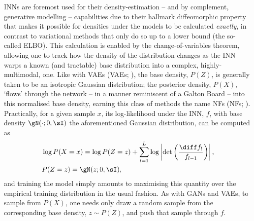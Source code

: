 \Acp{INN} are foremost used for their density-estimation -- and by complement, generative modelling
-- capabilities due to their hallmark diffeomorphic property that makes it possible for densities
under the models to be calculated \emph{exactly}, in contrast to variational methods that only do
so up to a lower bound (the so-called \ac{ELBO}). 
%
%
This calculation is enabled by the change-of-variables theorem, allowing one to track how the
density of the distribution changes as the \ac{INN} warps a known (and tractable) base distribution
into a complex, highly-multimodal, one.
%
Like with \aclp{VAE} (\acsp{VAE}; \citealp{kingma2014auto}), the base density, \(P(Z)\), is generally
taken to be an isotropic Gaussian distribution; the posterior density, \(P(X)\), `flows' through
the network -- in a manner reminiscent of a Galton Board -- into this normalised base density,
earning this class of methods the name \aclp{NF} (\acsp{NF}; \citealp{rezende2015variational,
kobyzev2020normalizing}).
%
Practically, for a given sample \(x\), its log-likelihood under the \ac{INN}, \(f\), with base
density \(\gN(\cdot; 0, \sI)\) the aforementioned Gaussian distribution, can be computed as
%
\begin{equation*}
%
    \begin{aligned}
        &\log P(X=x) = 
        \log P(Z=z) + \sum_{l=1}^L \log \left| \det\left( \frac{\diff f_l}{ f_{l-1}}\right)
        \right|, \\
        &P(Z=z) = \gN(z; 0, \sI),
    \end{aligned}
\label{eq:cov}
%
\end{equation*}
%
and training the model simply amounts to maximising this quantity over the empirical training
distribution in the usual fashion.
%
As with \acp{GAN} and \acp{VAE}, to sample from \(P(X)\), one needs only draw a random sample from
the corresponding base density, \(z \sim P(Z) \), and push that sample through \(f\).



